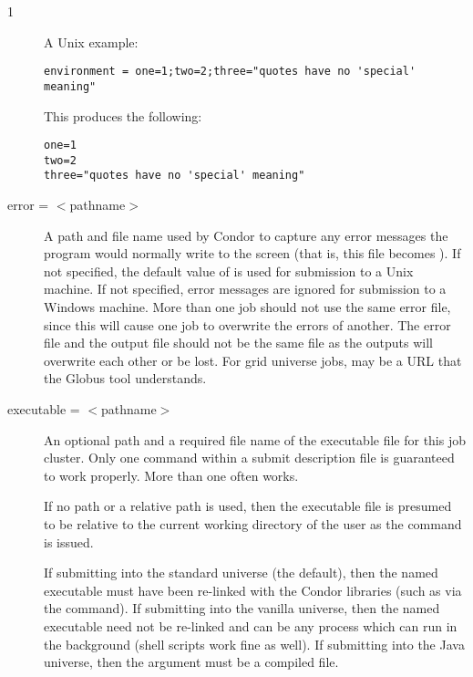 \begin{ManPage}{\label{man-condor-submit}}{1}
\begin{description}
A Unix example:

\begin{verbatim}
environment = one=1;two=2;three="quotes have no 'special' meaning"
\end{verbatim}

This produces the following:

\begin{verbatim}
one=1
two=2
three="quotes have no 'special' meaning"
\end{verbatim}




\item[error = $<$pathname$>$]
A path and file name used by Condor to capture any
error messages the program would normally write to the screen
(that is, this file becomes ).
If not specified, the default value of
 is used for submission to a Unix machine.
If not specified, error messages are ignored
for submission to a Windows machine.
More than one job should not use the same error file, since
this will cause one job to overwrite the errors of another.
The error file and the output file should not be the same file
as the outputs will overwrite each other or be lost.
For grid universe jobs,  may be a URL that the Globus
tool  understands.



\item[executable = $<$pathname$>$]
An optional path and a required file name of the executable file for this
job cluster. Only one  command within a
submit description file is guaranteed to work properly.
More than one often works.

If no path or a relative path is used, then the executable file
is presumed to be relative
to the current working directory of the user as the
 command is issued.

If submitting into the standard universe (the default),
then the named executable must have been re-linked with the Condor
libraries (such as via the  command). If submitting into
the vanilla universe, then the named executable need not be re-linked and
can be any process which can run in the background (shell scripts work
fine as well).  If submitting into the Java universe, then the argument
must be a compiled  file.


\end{description}
\end{ManPage}
